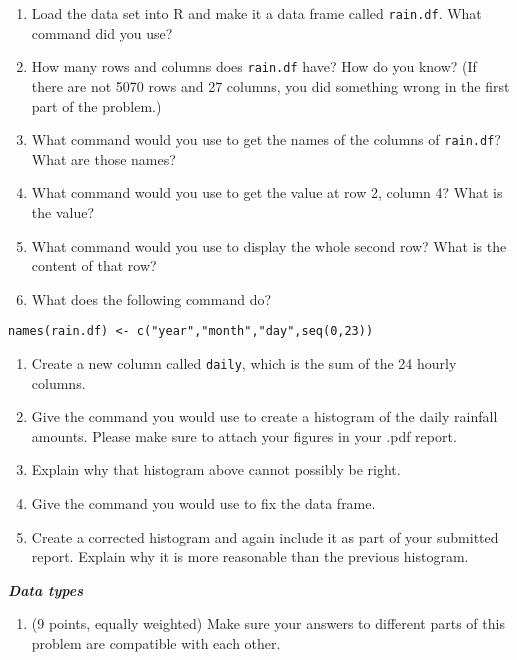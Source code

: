 \documentclass[
]{article}
\providecommand{\tightlist}{%
  \setlength{\itemsep}{0pt}\setlength{\parskip}{0pt}}
\begin{document}
\begin{enumerate}
\def\labelenumi{\alph{enumi}.}
\item
  Load the data set into R and make it a data frame called
  \texttt{rain.df}. What command did you use?
\item
  How many rows and columns does \texttt{rain.df} have? How do you know?
  (If there are not 5070 rows and 27 columns, you did something wrong in
  the first part of the problem.)
\item
  What command would you use to get the names of the columns of
  \texttt{rain.df}? What are those names?
\item
  What command would you use to get the value at row 2, column 4? What
  is the value?
\item
  What command would you use to display the whole second row? What is
  the content of that row?
\item
  What does the following command do?
\end{enumerate}

\begin{verbatim}
names(rain.df) <- c("year","month","day",seq(0,23))
\end{verbatim}

\begin{enumerate}
\def\labelenumi{\alph{enumi}.}
\setcounter{enumi}{6}
\tightlist
\item
  Create a new column called \texttt{daily}, which is the sum of the 24
  hourly columns.
\item
  Give the command you would use to create a histogram of the daily
  rainfall amounts. Please make sure to attach your figures in your .pdf
  report.
\item
  Explain why that histogram above cannot possibly be right.
\item
  Give the command you would use to fix the data frame.
\item
  Create a corrected histogram and again include it as part of your
  submitted report. Explain why it is more reasonable than the previous
  histogram.
\end{enumerate}

\textbf{\emph{Data types}}

\begin{enumerate}
\def\labelenumi{\arabic{enumi}.}
\setcounter{enumi}{1}
\tightlist
\item
  (9 points, equally weighted) Make sure your answers to different parts
  of this problem are compatible with each other.
\end{enumerate}
\end{document}
